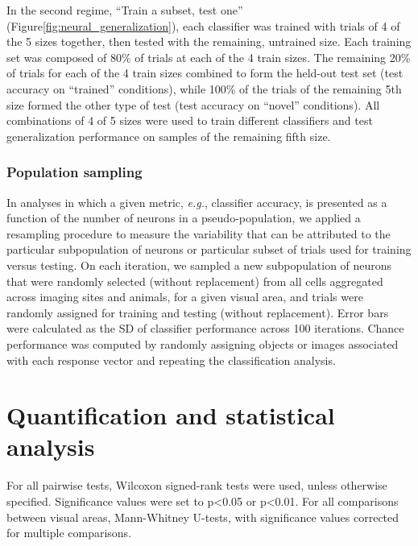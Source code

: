 In the second regime, ``Train a subset, test one'' (Figure\ref{fig:neural_generalization}),  each classifier was trained with trials of  4 of the 5 sizes together, then tested with the remaining, untrained size. Each training set was composed of 80\% of trials at each of the 4 train sizes. The remaining 20\% of trials for each of the 4 train sizes combined to form the held-out test set (test accuracy on ``trained'' conditions), while 100\% of the trials of the remaining 5th size formed the other type of test (test accuracy on ``novel'' conditions). All combinations of 4 of 5 sizes were used to train different classifiers and test generalization performance on samples of the remaining fifth size.

\subsubsection{Population sampling}
In analyses in which a given metric, \textit{e.g.}, classifier accuracy, is presented as a function of the number of neurons in a pseudo-population, we applied a resampling procedure to measure the variability that can be attributed to the particular subpopulation of neurons or particular subset of trials used for training versus testing. On each iteration, we sampled a new subpopulation of neurons that were randomly selected (without replacement) from all cells aggregated across imaging sites and animals, for a given visual area, and trials were randomly assigned for training and testing (without replacement). Error bars were calculated as the SD of classifier performance across 100 iterations. Chance performance was computed by randomly assigning objects or images associated with each response vector and repeating the classification analysis.


\section{Quantification and statistical analysis}
For all pairwise tests, Wilcoxon signed-rank tests were used, unless otherwise specified. Significance values were set to p<0.05 or p<0.01. For all comparisons between visual areas, Mann-Whitney U-tests, with significance values corrected for multiple comparisons.
